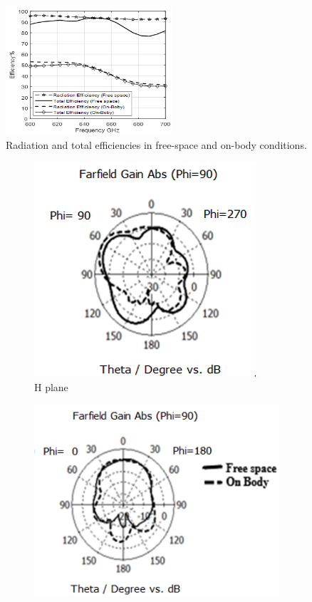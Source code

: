 \documentclass[12pt]{suhbook}
\begin{document}
% 
\begin{figure}[hbt!]
    \centering
    \includegraphics[width=0.55\textwidth]{12}
    \caption{Radiation and total efficiencies in free-space and on-body conditions.}
    \label{Fig 91}
\end{figure}
% 
\begin{figure}[hbt!]
\begin{subfigure}{.5\textwidth}
\centering
\includegraphics[width=.9\linewidth]{13}
\caption{H plane}
\label{fig:sfig10a}
\end{subfigure}%
\begin{subfigure}{.6\textwidth}
  \centering
  \includegraphics[width=.9\linewidth]{14}

\end{subfigure}
\end{figure}
\end{document}
